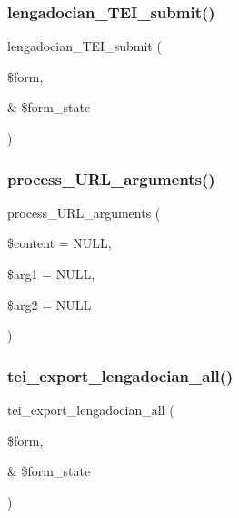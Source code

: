 \subsubsection{\texorpdfstring{lengadocian\+\_\+\+T\+E\+I\+\_\+submit()}{lengadocian\_TEI\_submit()}}
{\footnotesize\ttfamily lengadocian\+\_\+\+T\+E\+I\+\_\+submit (\begin{DoxyParamCaption}\item[{}]{\$form,  }\item[{\&}]{\$form\+\_\+state }\end{DoxyParamCaption})}

\hypertarget{conjoc__lengadocian__web_form_8inc_afecc813b5558b906fe6cc9adb1419c35}{}\label{conjoc__lengadocian__web_form_8inc_afecc813b5558b906fe6cc9adb1419c35} 
\subsubsection{\texorpdfstring{process\+\_\+\+U\+R\+L\+\_\+arguments()}{process\_URL\_arguments()}}
{\footnotesize\ttfamily process\+\_\+\+U\+R\+L\+\_\+arguments (\begin{DoxyParamCaption}\item[{}]{\$content = {\ttfamily NULL},  }\item[{}]{\$arg1 = {\ttfamily NULL},  }\item[{}]{\$arg2 = {\ttfamily NULL} }\end{DoxyParamCaption})}

\hypertarget{conjoc__lengadocian__web_form_8inc_a9c7725a828c1a44761bc51fe7a346215}{}\label{conjoc__lengadocian__web_form_8inc_a9c7725a828c1a44761bc51fe7a346215} 
\subsubsection{\texorpdfstring{tei\+\_\+export\+\_\+lengadocian\+\_\+all()}{tei\_export\_lengadocian\_all()}}
{\footnotesize\ttfamily tei\+\_\+export\+\_\+lengadocian\+\_\+all (\begin{DoxyParamCaption}\item[{}]{\$form,  }\item[{\&}]{\$form\+\_\+state }\end{DoxyParamCaption})}


